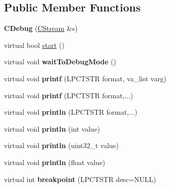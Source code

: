 \subsection*{Public Member Functions}
\begin{DoxyCompactItemize}
\item 
\hypertarget{class_c_debug_a5e5390068e9a979029fc6df202ad8b6e}{{\bfseries C\-Debug} (\hyperlink{class_c_stream}{C\-Stream} \&s)}\label{class_c_debug_a5e5390068e9a979029fc6df202ad8b6e}

\item 
virtual bool \hyperlink{class_c_debug_a40d1b7f50b76311b3a7fb148e5b7e2ea}{start} ()
\item 
\hypertarget{class_c_debug_a525c9b7e5f56eca7017ee8a519f86a3e}{virtual void {\bfseries wait\-To\-Debug\-Mode} ()}\label{class_c_debug_a525c9b7e5f56eca7017ee8a519f86a3e}

\item 
\hypertarget{class_c_debug_a89c983c24d2a2934187d25a27f6c1aa9}{virtual void {\bfseries printf} (L\-P\-C\-T\-S\-T\-R format, va\-\_\-list varg)}\label{class_c_debug_a89c983c24d2a2934187d25a27f6c1aa9}

\item 
\hypertarget{class_c_debug_a4f55fe7d7a21e9386da0484a1e4cd4cd}{virtual void {\bfseries printf} (L\-P\-C\-T\-S\-T\-R format,...)}\label{class_c_debug_a4f55fe7d7a21e9386da0484a1e4cd4cd}

\item 
\hypertarget{class_c_debug_a69b3be339e7fe9c991b39ef0f0e452c6}{virtual void {\bfseries println} (L\-P\-C\-T\-S\-T\-R format,...)}\label{class_c_debug_a69b3be339e7fe9c991b39ef0f0e452c6}

\item 
\hypertarget{class_c_debug_a6e7fadf6162782fa5b83635b737fb880}{virtual void {\bfseries println} (int value)}\label{class_c_debug_a6e7fadf6162782fa5b83635b737fb880}

\item 
\hypertarget{class_c_debug_aa58d1c7c44e669a77bd8fdf3e58d68cd}{virtual void {\bfseries println} (uint32\-\_\-t value)}\label{class_c_debug_aa58d1c7c44e669a77bd8fdf3e58d68cd}

\item 
\hypertarget{class_c_debug_ac129190a73c1ce50df847d61c57641c4}{virtual void {\bfseries println} (float value)}\label{class_c_debug_ac129190a73c1ce50df847d61c57641c4}

\item 
\hypertarget{class_c_debug_a260233f4b1d98901555a249c3f7ad7be}{virtual int {\bfseries breakpoint} (L\-P\-C\-T\-S\-T\-R desc=N\-U\-L\-L)}\label{class_c_debug_a260233f4b1d98901555a249c3f7ad7be}


\end{DoxyCompactItemize}
